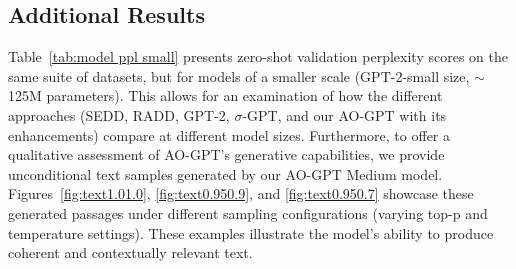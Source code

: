 \subsection{Additional Results}

Table~\ref{tab:model ppl small} presents zero-shot validation perplexity scores on the same suite of datasets, but for models of a smaller scale (GPT-2-small size, $\sim$125M parameters). This allows for an examination of how the different approaches (SEDD, RADD, GPT-2, $\sigma$-GPT, and our AO-GPT with its enhancements) compare at different model sizes. 
Furthermore, to offer a qualitative assessment of AO-GPT's generative capabilities, we provide unconditional text samples generated by our AO-GPT Medium model. Figures~\ref{fig:text1.01.0}, \ref{fig:text0.950.9}, and \ref{fig:text0.950.7} showcase these generated passages under different sampling configurations (varying top-p and temperature settings). These examples illustrate the model's ability to produce coherent and contextually relevant text.



